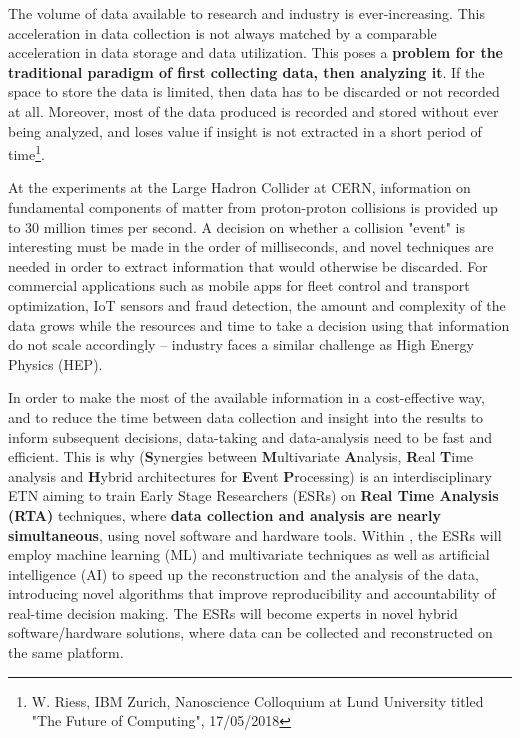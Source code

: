 \vspace{-2mm}

The volume of data available to research and industry is ever-increasing. 
This acceleration in data collection is not always matched by a comparable acceleration in data storage and data utilization. 
This poses a \textbf{problem for the traditional paradigm of first collecting data, then analyzing it}. 
If the space to store the data is limited, then data has to be discarded or not recorded at all. 
Moreover, most of the data produced is recorded and stored without ever being analyzed, and loses value if insight is not extracted in a short period of time\footnote{W. Riess, IBM Zurich, Nanoscience Colloquium at Lund University titled "The Future of Computing", 17/05/2018}. 

At the experiments at the Large Hadron Collider at CERN, information on fundamental components of matter from proton-proton collisions is provided up to 30 million times per second. 
A decision on whether a collision "event" is interesting must be made in the order of milliseconds, and novel techniques are needed in order to extract information that would otherwise be discarded. 
For commercial applications such as mobile apps for fleet control and transport optimization, IoT sensors and fraud detection, the amount and complexity of the data grows while the resources and time to take a decision using that information do not scale accordingly -- industry faces a similar challenge as High Energy Physics (HEP). 

In order to make the most of the available information in a cost-effective way, and to reduce the time between data collection and insight into the results to inform subsequent decisions, data-taking and data-analysis need to be fast and efficient. 
This is why \acronym ({\color{blue}\textbf{S}}ynergies between {\color{blue}\textbf{M}}ultivariate {\color{blue}\textbf{A}}nalysis, {\color{blue}\textbf{R}}eal {\color{blue}\textbf{T}}ime analysis and {\color{blue}\textbf{H}}ybrid architectures for {\color{blue}\textbf{E}}vent {\color{blue}\textbf{P}}rocessing) is an interdisciplinary ETN aiming to train Early Stage Researchers (ESRs) on \textbf{Real Time Analysis (RTA)} techniques, where \textbf{data collection and analysis are nearly simultaneous}, using novel software and hardware tools. 
Within \acronym, the ESRs will employ machine learning (ML) and multivariate techniques as well as artificial intelligence (AI) to speed up the reconstruction and the analysis of the data, introducing novel algorithms that improve reproducibility and accountability of real-time decision making. 
The ESRs will become experts in novel hybrid software/hardware solutions, where data can be collected and reconstructed on the same platform. 

